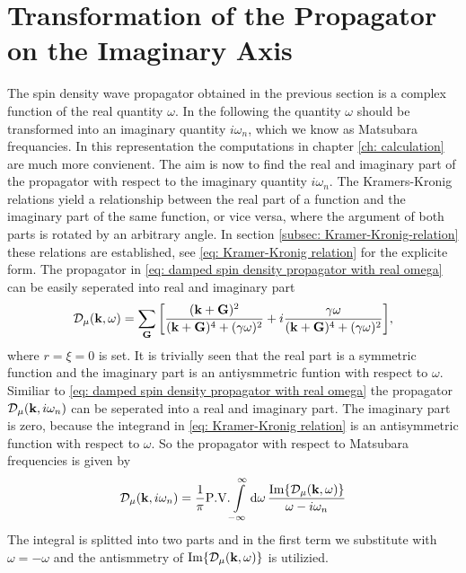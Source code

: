 \section{Transformation of the Propagator on the Imaginary Axis}
\label{sec: transformation of the propagator on the imaginary axis}
%
%
The spin density wave propagator obtained in the previous section is a complex function of the real quantity $\omega$.
In the following the quantity $\omega$ should be transformed into an imaginary quantity $i\omega_{n}$, which we know as Matsubara frequancies.
In this representation the computations in chapter \ref{ch: calculation} are much more convienent.
The aim is now to find the real and imaginary part of the propagator with respect to the imaginary quantity $i\omega_{n}$.
The Kramers-Kronig relations yield a relationship between the real part of a function and the imaginary part of the same function, or vice versa, where the argument of both parts is rotated by an arbitrary angle.
In section \ref{subsec: Kramer-Kronig-relation} these relations are established, see \eqref{eq: Kramer-Kronig relation} for the explicite form.
The propagator in \eqref{eq: damped spin density propagator with real omega} can be easily seperated into real and imaginary part
%
\begin{align}
	\mathcal{D}_{\mu}(\vb{k}, \omega) = \sum\limits_{\vb{G}} \bigg[\frac{(\vb{k}+\vb{G})^{2}}{(\vb{k}+\vb{G})^{4} + (\gamma\omega)^{2}} + i \frac{\gamma \omega}{(\vb{k}+\vb{G})^{4} + (\gamma\omega)^{2}}\bigg],
	\label{eq: real and imaginary part of D}
\end{align}
%
where $r = \xi = 0$ is set.
It is trivially seen that the real part is a symmetric function and the imaginary part is an antiysmmetric funtion with respect to $\omega$.
Similiar to \eqref{eq: damped spin density propagator with real omega} the propagator $\mathcal{D}_{\mu}(\vb{k}, i\omega_{n})$ can be seperated into a real and imaginary part.
The imaginary part is zero, because the integrand in \eqref{eq: Kramer-Kronig relation} is an antisymmetric function with respect to $\omega$.
So the propagator with respect to Matsubara frequencies is given by
%
\begin{align}
	\mathcal{D}_{\mu}(\vb{k}, i\omega_{n}) = \frac{1}{\pi} \PV{\int\limits_{-\infty}^{\infty} \dd{\omega} \frac{\Im{\mathcal{D}_{\mu}(\vb{k}, \omega)}}{\omega - i\omega_{n}}}
\end{align}
%
The integral is splitted into two parts and in the first term we substitute with $\omega = -\omega$ and the antismmetry of $\Im{\mathcal{D}_{\mu}(\vb{k}, \omega)}$ is utilizied.
